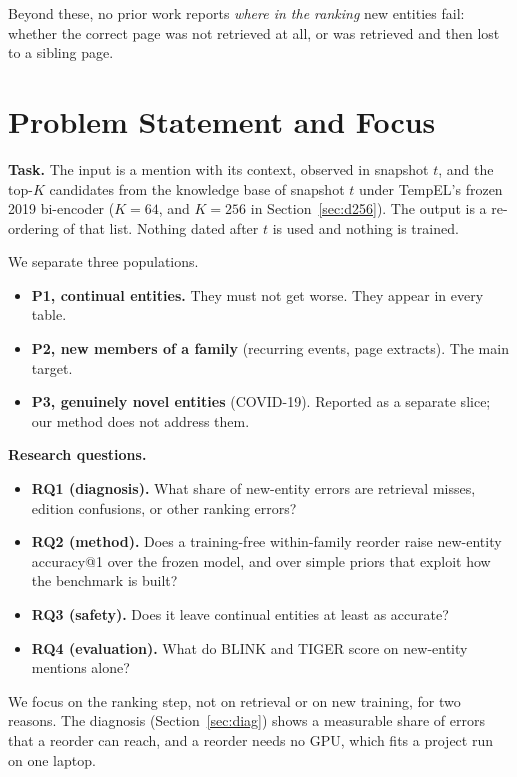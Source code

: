 \documentclass[conference]{IEEEtran}
\begin{document}
Beyond these, no prior work reports \emph{where in the ranking} new entities fail: whether the correct
page was not retrieved at all, or was retrieved and then lost to a sibling page.

\section{Problem Statement and Focus}

\textbf{Task.} The input is a mention with its context, observed in snapshot $t$, and the top-$K$
candidates from the knowledge base of snapshot $t$ under TempEL's frozen 2019 bi-encoder
($K = 64$, and $K = 256$ in Section~\ref{sec:d256}). The output is a re-ordering of that list.
Nothing dated after $t$ is used and nothing is trained.

We separate three populations.
\begin{itemize}
\item \textbf{P1, continual entities.} They must not get worse. They appear in every table.
\item \textbf{P2, new members of a family} (recurring events, page extracts). The main target.
\item \textbf{P3, genuinely novel entities} (COVID-19). Reported as a separate slice; our method does
not address them.
\end{itemize}

\textbf{Research questions.}
\begin{itemize}
\item \textbf{RQ1 (diagnosis).} What share of new-entity errors are retrieval misses, edition
confusions, or other ranking errors?
\item \textbf{RQ2 (method).} Does a training-free within-family reorder raise new-entity accuracy@1
over the frozen model, and over simple priors that exploit how the benchmark is built?
\item \textbf{RQ3 (safety).} Does it leave continual entities at least as accurate?
\item \textbf{RQ4 (evaluation).} What do BLINK and TIGER score on new-entity mentions alone?
\end{itemize}

We focus on the ranking step, not on retrieval or on new training, for two reasons. The diagnosis
(Section~\ref{sec:diag}) shows a measurable share of errors that a reorder can reach, and a reorder
needs no GPU, which fits a project run on one laptop.
\end{document}
